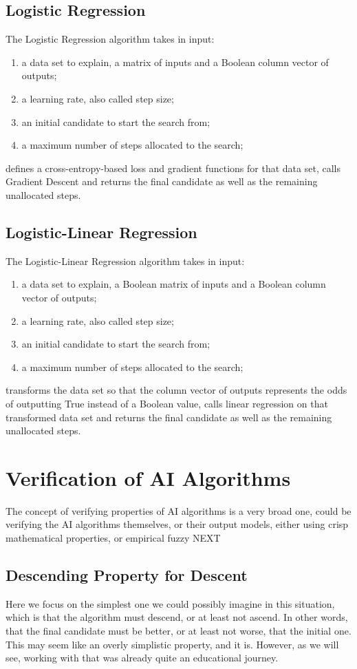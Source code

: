 \documentclass[]{report}
\begin{document}
\subsection{Logistic Regression}
The Logistic Regression algorithm takes in input:
\begin{enumerate}
\item a data set to explain, a matrix of inputs and a Boolean column
  vector of outputs;
\item a learning rate, also called step size;
\item an initial candidate to start the search from;
\item a maximum number of steps allocated to the search;
\end{enumerate}
defines a cross-entropy-based loss and gradient functions for that
data set, calls Gradient Descent and returns the final candidate as
well as the remaining unallocated steps.

\subsection{Logistic-Linear Regression}
The Logistic-Linear Regression algorithm takes in input:
\begin{enumerate}
\item a data set to explain, a Boolean matrix of inputs and a Boolean
  column vector of outputs;
\item a learning rate, also called step size;
\item an initial candidate to start the search from;
\item a maximum number of steps allocated to the search;
\end{enumerate}
transforms the data set so that the column vector of outputs
represents the odds of outputting True instead of a Boolean value,
calls linear regression on that transformed data set and returns the
final candidate as well as the remaining unallocated steps.

\section{Verification of AI Algorithms}

The concept of verifying properties of AI algorithms is a very broad
one, could be verifying the AI algorithms themselves, or their output
models, either using crisp mathematical properties, or empirical fuzzy
NEXT

\subsection{Descending Property for Descent}
Here we focus on the simplest one we could possibly imagine in this
situation, which is that the algorithm must descend, or at least not
ascend.  In other words, that the final candidate must be better, or
at least not worse, that the initial one.  This may seem like an
overly simplistic property, and it is.  However, as we will see,
working with that was already quite an educational journey.
\end{document}
